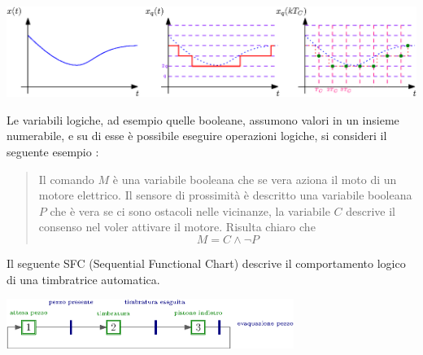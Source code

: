 \documentclass[10pt, letterpaper]{report}
\begin{document}
\begin{center}
    \includegraphics[width=1\textwidth ]{images/segnale.eps}
\end{center}
Le variabili logiche, ad esempio quelle booleane, assumono valori in un insieme numerabile, e su di esse 
è possibile eseguire operazioni logiche, si consideri il seguente esempio : \begin{quote}
    \color{gray}
    Il comando $M$ è una variabile booleana che se vera aziona il moto di un motore elettrico. 
    Il sensore di prossimità è descritto una variabile booleana $P$ che è vera se ci sono 
    ostacoli nelle vicinanze, la variabile $C$ descrive il consenso nel voler attivare il motore.\acc 
    Risulta chiaro che $$ M= C \land \lnot P$$\color{black}
\end{quote}
Il seguente SFC (Sequential Functional Chart) descrive il comportamento logico di una timbratrice 
automatica.\begin{center}
    \includegraphics[width=0.7\textwidth ]{images/timbratrice.eps}
\end{center}
\flowerLine 
\end{document}
